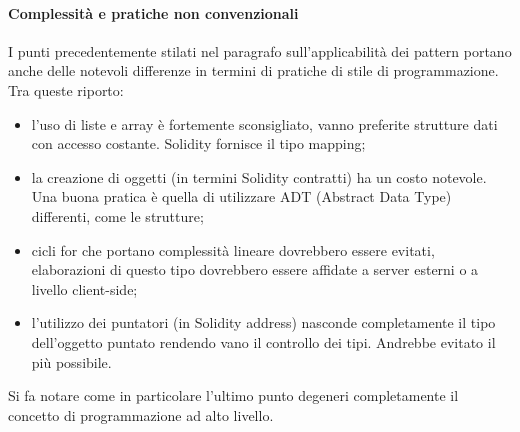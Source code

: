 \paragraph{Complessità e pratiche non convenzionali}
\label{cap:prestazioni}
I punti precedentemente stilati nel paragrafo sull’applicabilità dei pattern portano anche delle notevoli differenze in termini di pratiche di stile di programmazione. Tra queste riporto:
\begin{itemize}
    \item l’uso di liste e array è fortemente sconsigliato, vanno preferite strutture dati con accesso costante. Solidity fornisce il tipo mapping;
    \item la creazione di oggetti (in termini Solidity contratti) ha un costo notevole. Una buona pratica è quella di utilizzare ADT (Abstract Data Type) differenti, come le strutture;
    \item cicli for che portano complessità lineare dovrebbero essere evitati, elaborazioni di questo tipo dovrebbero essere affidate a server esterni o a livello client-side;
    \item l’utilizzo dei puntatori (in Solidity address) nasconde completamente il tipo dell’oggetto puntato rendendo vano il controllo dei tipi. Andrebbe evitato il più possibile.
\end{itemize}
Si fa notare come in particolare l’ultimo punto degeneri completamente il concetto di programmazione ad alto livello.

